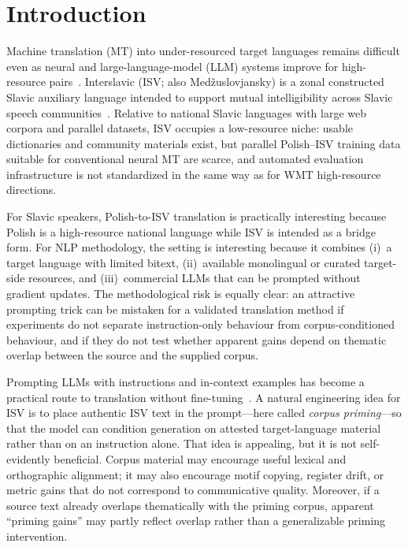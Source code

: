 
\section{Introduction}
\label{sec:intro}

Machine translation (MT) into under-resourced target languages remains difficult even as neural and large-language-model (LLM) systems improve for high-resource pairs~\citep{koehn-knowles-2017-six,maillard-etal-2023-small}.
Interslavic (ISV; also Med\v{z}uslovjansky) is a zonal constructed Slavic auxiliary language intended to support mutual intelligibility across Slavic speech communities~\citep{merunka-etal-2019-interslavic,merunka-molhanec-2016-neoslavonic}.
Relative to national Slavic languages with large web corpora and parallel datasets, ISV occupies a low-resource niche: usable dictionaries and community materials exist, but parallel Polish--ISV training data suitable for conventional neural MT are scarce, and automated evaluation infrastructure is not standardized in the same way as for WMT high-resource directions.

For Slavic speakers, Polish-to-ISV translation is practically interesting because Polish is a high-resource national language while ISV is intended as a bridge form.
For NLP methodology, the setting is interesting because it combines (i)~a target language with limited bitext, (ii)~available monolingual or curated target-side resources, and (iii)~commercial LLMs that can be prompted without gradient updates.
The methodological risk is equally clear: an attractive prompting trick can be mistaken for a validated translation method if experiments do not separate instruction-only behaviour from corpus-conditioned behaviour, and if they do not test whether apparent gains depend on thematic overlap between the source and the supplied corpus.

Prompting LLMs with instructions and in-context examples has become a practical route to translation without fine-tuning~\citep{brown2020language,hendy2023good,jiao2023chatgpt}.
A natural engineering idea for ISV is to place authentic ISV text in the prompt---here called \emph{corpus priming}---so that the model can condition generation on attested target-language material rather than on an instruction alone.
That idea is appealing, but it is not self-evidently beneficial.
Corpus material may encourage useful lexical and orthographic alignment; it may also encourage motif copying, register drift, or metric gains that do not correspond to communicative quality.
Moreover, if a source text already overlaps thematically with the priming corpus, apparent ``priming gains'' may partly reflect overlap rather than a generalizable priming intervention.

